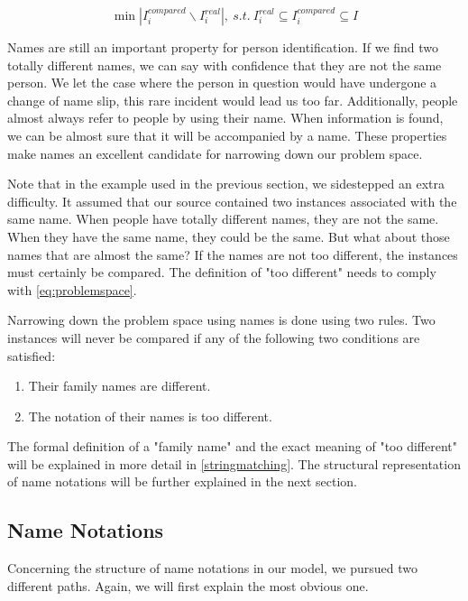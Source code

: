 \begin{equation}
\min |I^{compared}_i\backslash I^{real}_i|,\ s.t.\ I^{real}_i \subseteq I^{compared}_i \subseteq I
\label{eq:problemspace}
\end{equation}

Names are still an important property for person identification. If we find two totally different names, we can say with confidence that they are not the same person. We let the case where the person in question would have undergone a change of name slip, this rare incident would lead us too far. Additionally, people almost always refer to people by using their name. When information is found, we can be almost sure that it will be accompanied by a name. These properties make names an excellent candidate for narrowing down our problem space.

Note that in the example used in the previous section, we sidestepped an extra difficulty. It assumed that our source contained two instances associated with the same name. When people have totally different names, they are not the same. When they have the same name, they could be the same. But what about those names that are almost the same? If the names are not too different, the instances must certainly be compared. The definition of "too different" needs to comply with \autoref{eq:problemspace}.

Narrowing down the problem space using names is done using two rules. Two instances will never be compared if any of the following two conditions are satisfied:

\begin{enumerate}
\item Their family names are different.
\item The notation of their names is too different.
\end{enumerate}

The formal definition of a "family name" and the exact meaning of "too different" will be explained in more detail in \autoref{stringmatching}. The structural representation of name notations will be further explained in the next section.

\subsection{Name Notations}

Concerning the structure of name notations in our model, we pursued two different paths. Again, we will first explain the most obvious one. 

